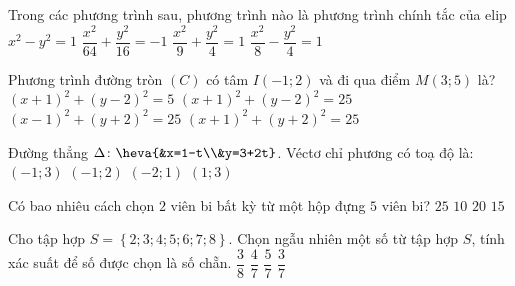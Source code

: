 \begin{ex}%
	Trong các phương trình sau, phương trình nào là phương trình chính tắc của elip
	\choice
	{$x^2-y^2=1$}
	{$\dfrac{x^2}{64}+\dfrac{y^2}{16}=-1$}
	{\True $\dfrac{x^2}{9}+\dfrac{y^2}{4}=1$}
	{$\dfrac{x^2}{8}-\dfrac{y^2}{4}=1$}
\end{ex}
\begin{ex}%
	Phương trình đường tròn $\left(C\right)$ có tâm $I\left(-1;2\right)$ và đi qua điểm $M\left(3;5\right)$ là?
	\choice
	{$\left(x+1\right)^2+\left(y-2\right)^2=5$}
	{\True $\left(x+1\right)^2+\left(y-2\right)^2=25$}
	{$\left(x-1\right)^2+\left(y+2\right)^2=25$}
	{$\left(x+1\right)^2+\left(y+2\right)^2=25$}
\end{ex}
\begin{ex}%
	Đường thẳng $\Delta\colon\heva{&x=1-t\\&y=3+2t}$. Véctơ chỉ phương có toạ độ là$\colon$
	\choice
	{$\left(-1;3\right)$}
	{\True $\left(-1;2\right)$}
	{$\left(-2;1\right)$}
	{$\left(1;3\right)$}
\end{ex}
\begin{ex}%
	Có bao nhiêu cách chọn $2$ viên bi bất kỳ từ một hộp đựng $5$ viên bi?
	\choice
	{$25$}
	{\True $10$}
	{$20$}
	{$15$}
\end{ex}
\begin{ex}%
	Cho tập hợp $S=\left\{2;3;4;5;6;7;8\right\}$. Chọn ngẫu nhiên một số từ tập hợp $S$, tính xác suất để số được chọn là số chẵn.
	\choice
	{$\dfrac{3}{8}$}
	{\True $\dfrac{4}{7}$}
	{$\dfrac{5}{7}$}
	{$\dfrac{3}{7}$}
\end{ex}
